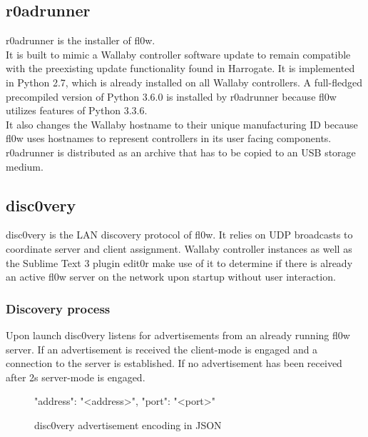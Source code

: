 \documentclass[conference,a4paper]{IEEEtran}
\begin{document}
\subsection{r0adrunner}
r0adrunner is the installer of fl0w\cite{fl0w:Philip Trauner}. \\It is built to mimic a Wallaby\cite{Wallaby Controller:KIPR} controller software update to remain compatible with the preexisting update functionality found in Harrogate\cite{Harrogate:KIPR}. It is implemented in Python\cite{Python:Python Foundation} 2.7, which is already installed on all Wallaby controllers. A full-fledged precompiled version of Python 3.6.0 is installed by r0adrunner because fl0w utilizes features of Python 3.3.6. \\It also changes the Wallaby hostname to their unique manufacturing ID because fl0w uses hostnames to represent controllers in its user facing components. r0adrunner is distributed as an archive that has to be copied to an USB storage medium.

\subsection{disc0very}
disc0very\cite{disc0very:Christoph Heiss} is the LAN discovery protocol of fl0w\cite{fl0w:Philip Trauner}. It relies on UDP\cite{UDP:J. Postel} broadcasts to coordinate server and client assignment. Wallaby controller instances as well as the Sublime Text 3\cite{Sublime Text 3:Sublime HQ} plugin edit0r\cite{edit0r:Philip Trauner} make use of it to determine if there is already an active fl0w server on the network upon startup without user interaction.


\subsubsection{Discovery process}
Upon launch disc0very\cite{disc0very:Christoph Heiss} listens for advertisements from an already running fl0w\cite{fl0w:Philip Trauner} server. If an advertisement is received the client-mode is engaged and a connection to the server is established. If no advertisement has been received after 2s server-mode is engaged.

\begin{figure}[H]
\centering
\begin{json}
{
    "address": "<address>",
    "port": "<port>"
}
\end{json}
\caption{disc0very\cite{disc0very:Christoph Heiss} advertisement encoding in JSON\cite{JSON:T. Bray Ed.}}
\label{fig:discovery_advertisement}
\end{figure}
\end{document}
